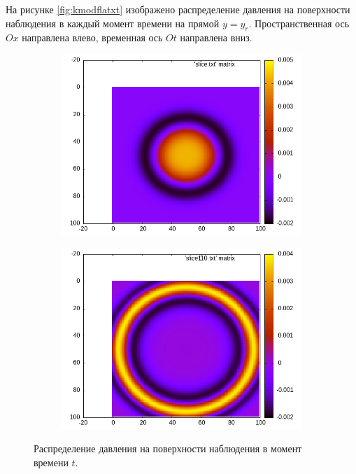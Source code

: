 \documentclass[a4paper, fontsize=14pt]{article}
\begin{document}
	На рисунке \ref{fig:kmodflatxt} изображено распределение давления на поверхности наблюдения в каждый момент времени на прямой $y=y_r$.
	Пространственная ось $Ox$ направлена влево, временная ось $Ot$ направлена вниз. 
	\begin{figure}[h]
		\begin{subfigure}{0.5\textwidth}
			\includegraphics[width=\textwidth]{slicet1.png}
		\end{subfigure}
		\begin{subfigure}{0.5\textwidth}
			\includegraphics[width=\textwidth]{slicet1.1.png}
		\end{subfigure}
		\label{fig:kmodflatxy}
		\caption{Распределение давления на поверхности наблюдения в момент времени $t$.}
	\end{figure}
\end{document}
